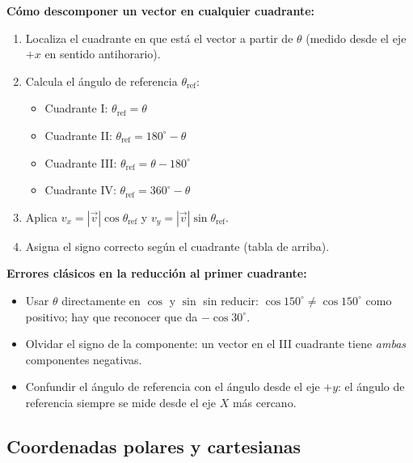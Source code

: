 \documentclass[12pt, letterpaper]{article}
\providecommand{\sen}{\sin}
\begin{document}
\begin{cuadropasos}
  \textbf{Cómo descomponer un vector en cualquier cuadrante:}
  \begin{enumerate}[leftmargin=*]
    \item Localiza el cuadrante en que está el vector a partir de $\theta$ (medido desde el eje $+x$ en sentido antihorario).
    \item Calcula el ángulo de referencia $\theta_{\text{ref}}$:
          \begin{itemize}
            \item Cuadrante I:   $\theta_{\text{ref}} = \theta$
            \item Cuadrante II:  $\theta_{\text{ref}} = 180^\circ - \theta$
            \item Cuadrante III: $\theta_{\text{ref}} = \theta - 180^\circ$
            \item Cuadrante IV:  $\theta_{\text{ref}} = 360^\circ - \theta$
          \end{itemize}
    \item Aplica $v_x = |\vec{v}|\cos\theta_{\text{ref}}$ y $v_y = |\vec{v}|\sen\theta_{\text{ref}}$.
    \item Asigna el signo correcto según el cuadrante (tabla de arriba).
  \end{enumerate}
\end{cuadropasos}

\begin{cuadroadvertencia}
  \textbf{Errores clásicos en la reducción al primer cuadrante:}
  \begin{itemize}[leftmargin=*]
    \item Usar $\theta$ directamente en $\cos$ y $\sen$ sin reducir: $\cos 150^\circ \neq \cos 150^\circ$ como positivo; hay que reconocer que da $-\cos 30^\circ$.
    \item Olvidar el signo de la componente: un vector en el III cuadrante tiene \emph{ambas} componentes negativas.
    \item Confundir el ángulo de referencia con el ángulo desde el eje $+y$: el ángulo de referencia siempre se mide desde el eje $X$ más cercano.
  \end{itemize}
\end{cuadroadvertencia}

\subsection{Coordenadas polares y cartesianas}
\end{document}
